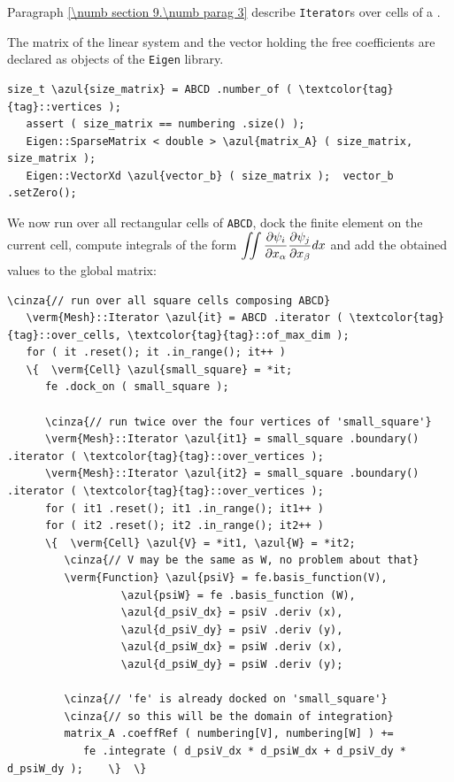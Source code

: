 Paragraph \ref{\numb section 9.\numb parag 3} describe {\small\tt Iterator}s over
cells of a {\small\tt{}}.

The matrix of the linear system and the vector holding the free coefficients
are declared as objects of the {\small\tt Eigen} library.

\begin{Verbatim}[commandchars=\\\{\},formatcom=\small\tt,frame=single,
   label=parag-\ref{\numb section 6.\numb parag 2}.cpp,rulecolor=\color{coment},
   baselinestretch=0.94,framesep=2mm                                            ]
   size_t \azul{size_matrix} = ABCD .number_of ( \textcolor{tag}{tag}::vertices );
   assert ( size_matrix == numbering .size() );
   Eigen::SparseMatrix < double > \azul{matrix_A} ( size_matrix, size_matrix );
   Eigen::VectorXd \azul{vector_b} ( size_matrix );  vector_b .setZero();
\end{Verbatim}

We now run over all rectangular cells of {\small\tt ABCD}, dock the finite element
on the current cell,
compute integrals of the form $ \displaystyle \int\!\!\!\int {\partial \psi_i \over
\partial x_\alpha} {\partial \psi_j \over \partial x_\beta} dx $ and add the obtained
values to the global matrix:

\begin{Verbatim}[commandchars=\\\{\},formatcom=\small\tt,frame=single,
   label=parag-\ref{\numb section 6.\numb parag 2}.cpp,rulecolor=\color{coment},
   baselinestretch=0.94,framesep=2mm                                            ]
   \cinza{// run over all square cells composing ABCD}
   \verm{Mesh}::Iterator \azul{it} = ABCD .iterator ( \textcolor{tag}{tag}::over_cells, \textcolor{tag}{tag}::of_max_dim );
   for ( it .reset(); it .in_range(); it++ )
   \{  \verm{Cell} \azul{small_square} = *it;
      fe .dock_on ( small_square );

      \cinza{// run twice over the four vertices of 'small_square'}
      \verm{Mesh}::Iterator \azul{it1} = small_square .boundary() .iterator ( \textcolor{tag}{tag}::over_vertices );
      \verm{Mesh}::Iterator \azul{it2} = small_square .boundary() .iterator ( \textcolor{tag}{tag}::over_vertices );
      for ( it1 .reset(); it1 .in_range(); it1++ )
      for ( it2 .reset(); it2 .in_range(); it2++ )
      \{  \verm{Cell} \azul{V} = *it1, \azul{W} = *it2;
         \cinza{// V may be the same as W, no problem about that}
         \verm{Function} \azul{psiV} = fe.basis_function(V),
                  \azul{psiW} = fe .basis_function (W),
                  \azul{d_psiV_dx} = psiV .deriv (x),
                  \azul{d_psiV_dy} = psiV .deriv (y),
                  \azul{d_psiW_dx} = psiW .deriv (x),
                  \azul{d_psiW_dy} = psiW .deriv (y);
                  
         \cinza{// 'fe' is already docked on 'small_square'}
         \cinza{// so this will be the domain of integration}
         matrix_A .coeffRef ( numbering[V], numbering[W] ) +=
            fe .integrate ( d_psiV_dx * d_psiW_dx + d_psiV_dy * d_psiW_dy );    \}  \}
\end{Verbatim}

